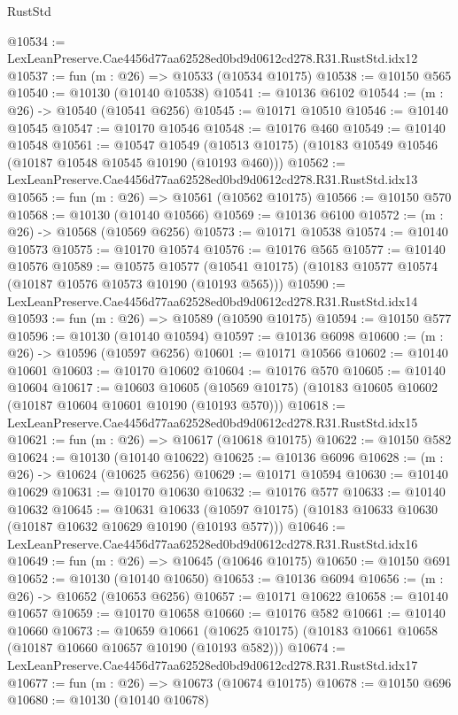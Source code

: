 \begin{lexlean}{RustStd}
\begin{coremodule}
@10534 := LexLeanPreserve.Cae4456d77aa62528ed0bd9d0612cd278.R31.RustStd.idx12
@10537 := fun (m : @26) => @10533 (@10534 @10175)
@10538 := @10150 @565
@10540 := @10130 (@10140 @10538)
@10541 := @10136 @6102
@10544 := (m : @26) -> @10540 (@10541 @6256)
@10545 := @10171 @10510
@10546 := @10140 @10545
@10547 := @10170 @10546
@10548 := @10176 @460
@10549 := @10140 @10548
@10561 := @10547
    @10549
    (@10513 @10175)
    (@10183 @10549 @10546 (@10187 @10548 @10545 @10190 (@10193 @460)))
@10562 := LexLeanPreserve.Cae4456d77aa62528ed0bd9d0612cd278.R31.RustStd.idx13
@10565 := fun (m : @26) => @10561 (@10562 @10175)
@10566 := @10150 @570
@10568 := @10130 (@10140 @10566)
@10569 := @10136 @6100
@10572 := (m : @26) -> @10568 (@10569 @6256)
@10573 := @10171 @10538
@10574 := @10140 @10573
@10575 := @10170 @10574
@10576 := @10176 @565
@10577 := @10140 @10576
@10589 := @10575
    @10577
    (@10541 @10175)
    (@10183 @10577 @10574 (@10187 @10576 @10573 @10190 (@10193 @565)))
@10590 := LexLeanPreserve.Cae4456d77aa62528ed0bd9d0612cd278.R31.RustStd.idx14
@10593 := fun (m : @26) => @10589 (@10590 @10175)
@10594 := @10150 @577
@10596 := @10130 (@10140 @10594)
@10597 := @10136 @6098
@10600 := (m : @26) -> @10596 (@10597 @6256)
@10601 := @10171 @10566
@10602 := @10140 @10601
@10603 := @10170 @10602
@10604 := @10176 @570
@10605 := @10140 @10604
@10617 := @10603
    @10605
    (@10569 @10175)
    (@10183 @10605 @10602 (@10187 @10604 @10601 @10190 (@10193 @570)))
@10618 := LexLeanPreserve.Cae4456d77aa62528ed0bd9d0612cd278.R31.RustStd.idx15
@10621 := fun (m : @26) => @10617 (@10618 @10175)
@10622 := @10150 @582
@10624 := @10130 (@10140 @10622)
@10625 := @10136 @6096
@10628 := (m : @26) -> @10624 (@10625 @6256)
@10629 := @10171 @10594
@10630 := @10140 @10629
@10631 := @10170 @10630
@10632 := @10176 @577
@10633 := @10140 @10632
@10645 := @10631
    @10633
    (@10597 @10175)
    (@10183 @10633 @10630 (@10187 @10632 @10629 @10190 (@10193 @577)))
@10646 := LexLeanPreserve.Cae4456d77aa62528ed0bd9d0612cd278.R31.RustStd.idx16
@10649 := fun (m : @26) => @10645 (@10646 @10175)
@10650 := @10150 @691
@10652 := @10130 (@10140 @10650)
@10653 := @10136 @6094
@10656 := (m : @26) -> @10652 (@10653 @6256)
@10657 := @10171 @10622
@10658 := @10140 @10657
@10659 := @10170 @10658
@10660 := @10176 @582
@10661 := @10140 @10660
@10673 := @10659
    @10661
    (@10625 @10175)
    (@10183 @10661 @10658 (@10187 @10660 @10657 @10190 (@10193 @582)))
@10674 := LexLeanPreserve.Cae4456d77aa62528ed0bd9d0612cd278.R31.RustStd.idx17
@10677 := fun (m : @26) => @10673 (@10674 @10175)
@10678 := @10150 @696
@10680 := @10130 (@10140 @10678)

\end{coremodule}
\end{lexlean}
